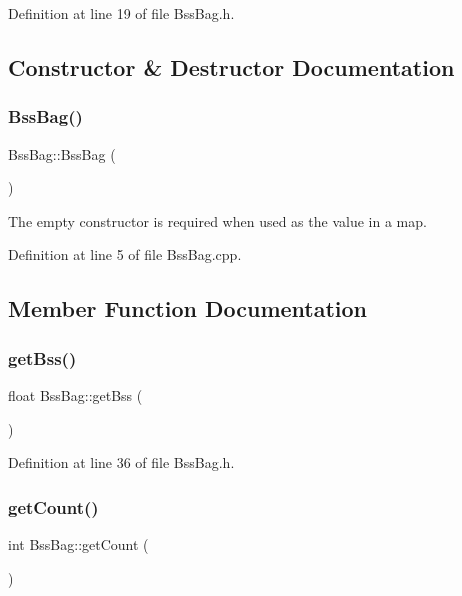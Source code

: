 Definition at line 19 of file Bss\+Bag.\+h.



\subsection{Constructor \& Destructor Documentation}
\mbox{\label{class_bss_bag_abb31cee62944f202a6756bd6fcd6c158}} 
\subsubsection{\texorpdfstring{Bss\+Bag()}{BssBag()}}
{\footnotesize\ttfamily Bss\+Bag\+::\+Bss\+Bag (\begin{DoxyParamCaption}{ }\end{DoxyParamCaption})}

The empty constructor is required when used as the value in a map. 

Definition at line 5 of file Bss\+Bag.\+cpp.



\subsection{Member Function Documentation}
\mbox{\label{class_bss_bag_ac0e679534b5a13c40fdfb762179a8ea7}} 
\subsubsection{\texorpdfstring{get\+Bss()}{getBss()}}
{\footnotesize\ttfamily float Bss\+Bag\+::get\+Bss (\begin{DoxyParamCaption}{ }\end{DoxyParamCaption})\hspace{0.3cm}{\ttfamily [inline]}}



Definition at line 36 of file Bss\+Bag.\+h.

\mbox{\label{class_bss_bag_a138d22f0c4e2ef662be9029939fc48a9}} 
\subsubsection{\texorpdfstring{get\+Count()}{getCount()}}
{\footnotesize\ttfamily int Bss\+Bag\+::get\+Count (\begin{DoxyParamCaption}{ }\end{DoxyParamCaption})\hspace{0.3cm}{\ttfamily [inline]}}



